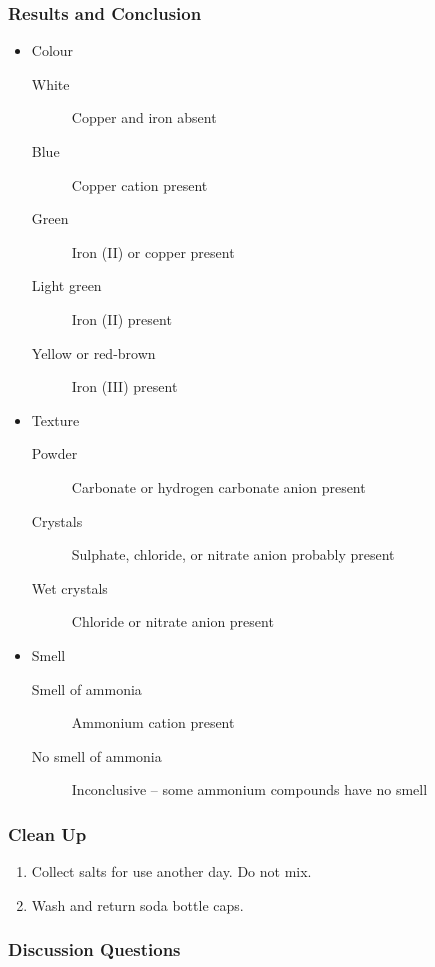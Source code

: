 \subsubsection{Results and Conclusion}
\begin{itemize}
\item{Colour}
\begin{description}
\item[White]{Copper and iron absent}
\item[Blue]{Copper cation present}
\item[Green]{Iron (II) or copper present}
\item[Light green]{Iron (II) present}
\item[Yellow or red-brown]{Iron (III) present}
\end{description}
\item{Texture}
\begin{description}
\item[Powder]{Carbonate or hydrogen carbonate anion present}
\item[Crystals]{Sulphate, chloride, or nitrate anion probably present}
\item[Wet crystals]{Chloride or nitrate anion present}
\end{description}
\item{Smell}
\begin{description}
\item[Smell of ammonia]{Ammonium cation present}
\item[No smell of ammonia]{Inconclusive -- some ammonium compounds have no smell}
\end{description}
\end{itemize}

\subsubsection{Clean Up}
\begin{enumerate}
\item{Collect salts for use another day. Do not mix.}
\item{Wash and return soda bottle caps.}
\end{enumerate}

\subsubsection{Discussion Questions}
\begin{enumerate}
\end{enumerate}

